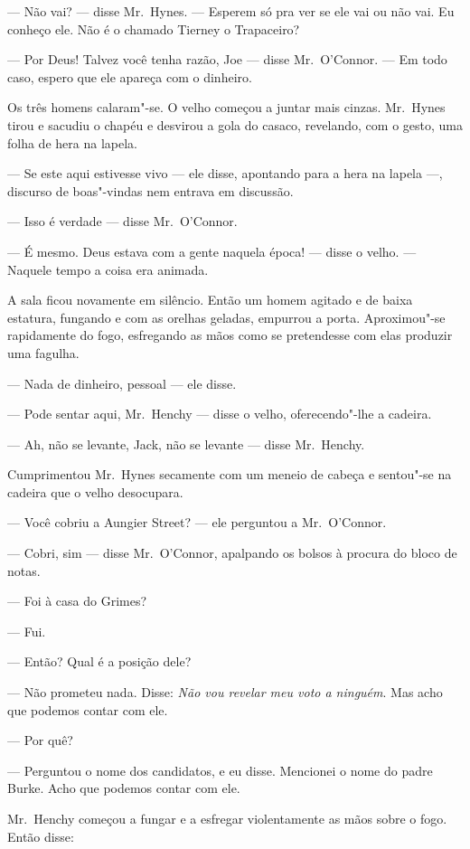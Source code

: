 --- Não vai? --- disse Mr.~Hynes.  --- Esperem só pra ver se ele vai ou não
vai.  Eu conheço ele.  Não é o chamado Tierney o Trapaceiro?

--- Por Deus!  Talvez você tenha razão, Joe --- disse Mr.~O’Connor.  --- Em
todo caso, espero que ele apareça com o dinheiro.

Os três homens calaram"-se.  O velho começou a juntar mais cinzas.  Mr.~Hynes
tirou e sacudiu o chapéu e desvirou a gola do casaco, revelando, com o gesto,
uma folha de hera na lapela.

--- Se este aqui estivesse vivo --- ele disse, apontando para a hera na lapela
---, discurso de boas"-vindas nem entrava em discussão.

--- Isso é verdade --- disse Mr.~O’Connor.

--- É mesmo.  Deus estava com a gente naquela época! --- disse o velho.  ---
Naquele tempo a coisa era animada.

A sala ficou novamente em silêncio.  Então um homem agitado e de baixa
estatura, fungando e com as orelhas geladas, empurrou a porta.  Aproximou"-se
rapidamente do fogo, esfregando as mãos como se pretendesse com elas produzir
uma fagulha.

--- Nada de dinheiro, pessoal --- ele disse.

--- Pode sentar aqui, Mr.~Henchy --- disse o velho, oferecendo"-lhe a cadeira.

--- Ah, não se levante, Jack, não se levante --- disse Mr.~Henchy.

Cumprimentou Mr.~Hynes secamente com um meneio de cabeça e sentou"-se na cadeira
que o velho desocupara.

--- Você cobriu a Aungier Street? --- ele perguntou a Mr.~O’Connor.

--- Cobri, sim --- disse Mr.~O’Connor, apalpando os bolsos à procura do bloco
de notas.

--- Foi à casa do Grimes?

--- Fui.

--- Então?  Qual é a posição dele?

--- Não prometeu nada.  Disse: \textit{Não vou revelar meu voto a
ninguém}.  Mas acho que podemos contar com ele.

--- Por quê?

--- Perguntou o nome dos candidatos, e eu disse.  Mencionei o nome do padre
Burke.  Acho que podemos contar com ele.

Mr.~Henchy começou a fungar e a esfregar violentamente as mãos sobre o fogo.
Então disse:


